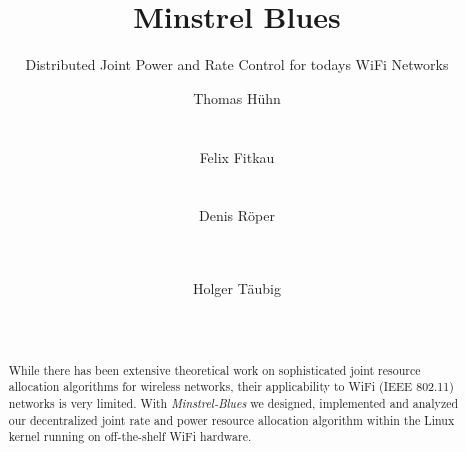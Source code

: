 \documentclass{sig-alternate}
\begin{document}
	\title{Minstrel Blues}
	\subtitle{Distributed Joint Power and Rate Control for todays WiFi Networks}

	\author{
		\alignauthor
		Thomas H{\"u}hn
			\\
	    		\\
			\\
		\alignauthor
		Felix Fitkau\\
	    		\\
			\\
		\alignauthor
		Denis R{\"o}per\\
	    		\\
			\\
		\and
		\alignauthor
		Holger T{\"a}ubig\\
	    		\\
			\\
	}

	\maketitle
	\sloppy

	\begin{abstract}
	While there has been extensive theoretical work on sophisticated
	joint resource allocation algorithms for wireless networks,
	their applicability to WiFi (IEEE 802.11) networks is very limited.
	With \textit{Minstrel-Blues} we designed, implemented and analyzed
	our decentralized joint rate and power resource allocation algorithm
	within the Linux kernel	running on off-the-shelf WiFi hardware.
	\end{abstract}


\end{document}
